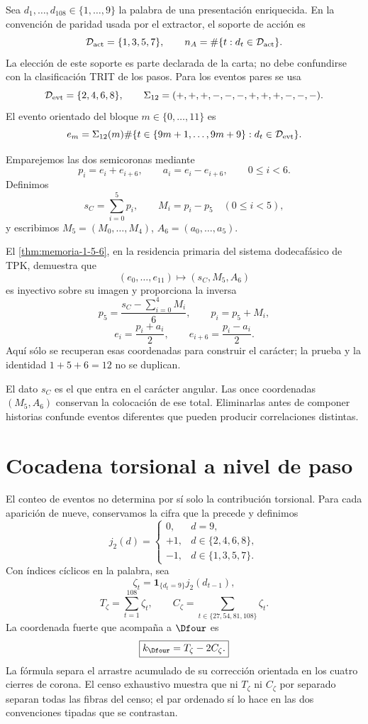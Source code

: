 Sea \(d_1,\ldots,d_{108}\in\{1,\ldots,9\}\) la palabra de una presentación
enriquecida. En la convención de paridad usada por el extractor, el soporte de
acción es
\[
 \mathcal D_{\rm act}=\{1,3,5,7\},
 \qquad
 n_A=\#\{t:d_t\in\mathcal D_{\rm act}\}.
\]
La elección de este soporte es parte declarada de la carta; no debe
confundirse con la clasificación TRIT de los pasos. Para los eventos pares se
usa
\[
 \mathcal D_{\rm evt}=\{2,4,6,8\},
 \qquad
 \Sigma_{12}=(+,+,+,-,-,-,+,+,+,-,-,-).
\]
El evento orientado del bloque \(m\in\{0,\ldots,11\}\) es
\[
 e_m=\Sigma_{12}(m)
 \#\{t\in\{9m+1,\ldots,9m+9\}:d_t\in\mathcal D_{\rm evt}\}.
\]

Emparejemos las dos semicoronas mediante
\[
 p_i=e_i+e_{i+6},
 \qquad
 a_i=e_i-e_{i+6},
 \qquad 0\leq i<6.
\]
Definimos
\[
 s_C=\sum_{i=0}^{5}p_i,
 \qquad
 M_i=p_i-p_5\quad(0\leq i<5),
\]
y escribimos \(M_5=(M_0,\ldots,M_4)\),
\(A_6=(a_0,\ldots,a_5)\).

El \cref{thm:memoria-1-5-6}, en la residencia primaria del sistema
dodecafásico de TPK, demuestra que
\[
 (e_0,\ldots,e_{11})\longmapsto(s_C,M_5,A_6)
\]
es inyectivo sobre su imagen y proporciona la inversa
\[
 p_5=\frac{s_C-\sum_{i=0}^{4}M_i}{6},\qquad
 p_i=p_5+M_i,
\]
\[
 e_i=\frac{p_i+a_i}{2},\qquad
 e_{i+6}=\frac{p_i-a_i}{2}.
\]
Aquí sólo se recuperan esas coordenadas para construir el carácter; la
prueba y la identidad \(1+5+6=12\) no se duplican.

El dato \(s_C\) es el que entra en el carácter angular. Las once coordenadas
\((M_5,A_6)\) conservan la colocación de ese total. Eliminarlas antes de
componer historias confunde eventos diferentes que pueden producir
correlaciones distintas.

\section{Cocadena torsional a nivel de paso}

El conteo de eventos no determina por sí solo la contribución torsional. Para
cada aparición de nueve, conservamos la cifra que la precede y definimos
\[
 j_2(d)=
 \begin{cases}
 0,&d=9,\\
 +1,&d\in\{2,4,6,8\},\\
 -1,&d\in\{1,3,5,7\}.
 \end{cases}
\]
Con índices cíclicos en la palabra, sea
\[
 \zeta_t=\mathbf 1_{\{d_t=9\}}j_2(d_{t-1}),
\]
\[
 T_\zeta=\sum_{t=1}^{108}\zeta_t,
 \qquad
 C_\zeta=\sum_{t\in\{27,54,81,108\}}\zeta_t.
\]
La coordenada fuerte que acompaña a \(\Dfour\) es
\[
 \boxed{k_{\Dfour}=T_\zeta-2C_\zeta.}
\]
La fórmula separa el arrastre acumulado de su corrección orientada en los
cuatro cierres de corona. El censo exhaustivo muestra que ni
\(T_\zeta\) ni \(C_\zeta\) por separado separan todas las fibras del censo;
el par ordenado sí lo hace en las dos convenciones tipadas que se contrastan.

